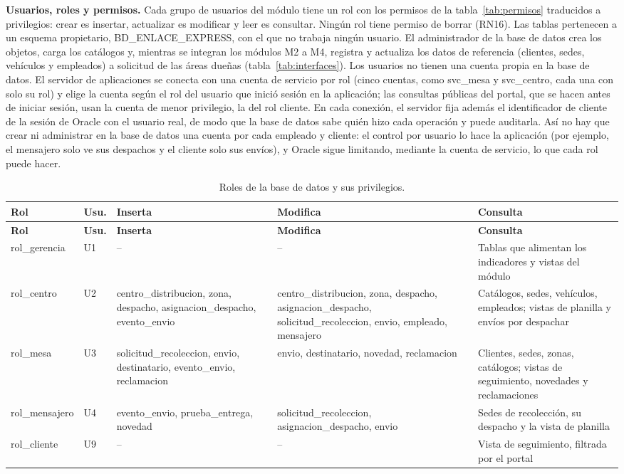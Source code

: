 \textbf{Usuarios, roles y permisos.} Cada grupo de usuarios del módulo
tiene un rol con los permisos de la tabla~\ref{tab:permisos} traducidos a
privilegios: crear es insertar, actualizar es modificar y leer es
consultar. Ningún rol tiene permiso de borrar (RN16). Las tablas
pertenecen a un esquema propietario, BD\_ENLACE\_EXPRESS, con el que no
trabaja ningún usuario. El administrador de la base de datos crea los objetos,
carga los catálogos y, mientras se integran los módulos M2 a M4,
registra y actualiza los datos de referencia (clientes, sedes,
vehículos y empleados) a solicitud de las áreas dueñas
(tabla~\ref{tab:interfaces}). Los usuarios no tienen una cuenta propia
en la base de datos. El servidor de aplicaciones se conecta con una
cuenta de servicio por rol (cinco cuentas, como svc\_mesa y svc\_centro,
cada una con solo su rol) y elige la cuenta según el rol del usuario que
inició sesión en la aplicación; las consultas públicas del portal, que se
hacen antes de iniciar sesión, usan la cuenta de menor privilegio, la del
rol cliente. En cada conexión, el servidor fija además el identificador
de cliente de la sesión de Oracle con el usuario real, de modo que la
base de datos sabe quién hizo cada operación y puede auditarla. Así no
hay que crear ni administrar en la base de datos una cuenta por cada
empleado y cliente: el control por usuario lo hace la aplicación (por
ejemplo, el mensajero solo ve sus despachos y el cliente solo sus
envíos), y Oracle sigue limitando, mediante la cuenta de servicio, lo que
cada rol puede hacer.

{\singlespacing\small
\begin{longtable}{L{2.3cm} L{0.9cm} L{3.6cm} L{3.6cm} L{3.5cm}}
\caption{Roles de la base de datos y sus privilegios.}
\label{tab:roles}\\
\toprule
\textbf{Rol} & \textbf{Usu.} & \textbf{Inserta} & \textbf{Modifica} & \textbf{Consulta} \\
\midrule
\endfirsthead
\toprule
\textbf{Rol} & \textbf{Usu.} & \textbf{Inserta} & \textbf{Modifica} & \textbf{Consulta} \\
\midrule
\endhead
\bottomrule
\endfoot
rol\_gerencia & U1 & -- & -- & Tablas que alimentan los indicadores y vistas del módulo \\
rol\_centro & U2 & centro\_distribucion, zona, despacho, asignacion\_despacho, evento\_envio & centro\_distribucion, zona, despacho, asignacion\_despacho, solicitud\_recoleccion, envio, empleado, mensajero & Catálogos, sedes, vehículos, empleados; vistas de planilla y envíos por despachar \\
rol\_mesa & U3 & solicitud\_recoleccion, envio, destinatario, evento\_envio, reclamacion & envio, destinatario, novedad, reclamacion & Clientes, sedes, zonas, catálogos; vistas de seguimiento, novedades y reclamaciones \\
rol\_mensajero & U4 & evento\_envio, prueba\_entrega, novedad & solicitud\_recoleccion, asignacion\_despacho, envio & Sedes de recolección, su despacho y la vista de planilla \\
rol\_cliente & U9 & -- & -- & Vista de seguimiento, filtrada por el portal \\
\end{longtable}
\par}

